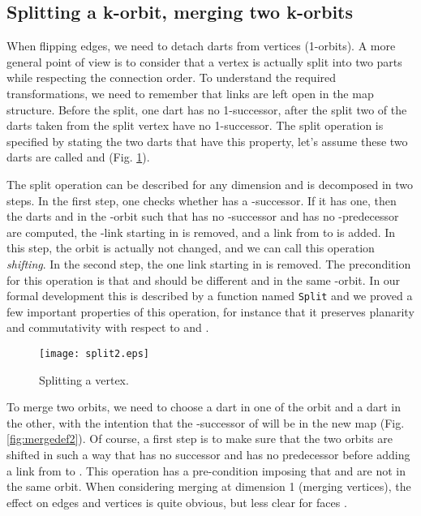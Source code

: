 \documentclass{llncs}
\begin{document}
\subsection{Splitting a k-orbit, merging two k-orbits}
When flipping edges, we need to detach darts from vertices (1-orbits).
A more general point of view is to consider that a vertex is actually
split into two parts while respecting the connection order.  To
understand the required transformations, we need to remember that links
are left open in the map structure. Before the split, one dart
has no 1-successor, after the split two of the darts taken from the split
vertex have no 1-successor.  The split operation is specified by stating the
two darts that have this property, let's assume these two darts are called
 and  (Fig. \ref{fig:split2}).

The split operation can be described for any dimension  and is
decomposed in two steps.  In the first step, one checks whether 
has a -successor.  If it has one, then the darts  and 
in the -orbit such that  has no -successor and 
has no -predecessor are computed, the -link starting in
 is removed, and a link from  to  is added.  In this
step, the orbit is actually not changed, and we can call this operation
{\em shifting}.  In the second step, the one
link starting in  is removed.  The precondition for this
operation is that  and  should be different and in the same
-orbit.  In our formal development this is described by a
function named {\tt Split} and we proved a few important properties of this operation, for instance that it preserves planarity and
commutativity with respect to  and .
\begin{figure}
\begin{center}
\texttt{[image: split2.eps]}
\end{center}
\caption{Splitting a vertex.}
\label{fig:split2}
\end{figure}

To merge two orbits, we need to choose a dart  in one of the
orbit and a dart  in the other, with the intention that the
-successor of  will be  in the new map (Fig. \ref{fig:mergedef2}).  Of course, a
first step is to make sure that the two orbits are shifted in such a way
that  has no successor and  has no predecessor before adding
a link from  to . This operation has a pre-condition imposing that  and  are not in the same orbit.  When considering merging at dimension 1 (merging vertices), the effect on edges and vertices is quite obvious, but less clear for faces \cite{duf08a,duf09b}.
\end{document}
